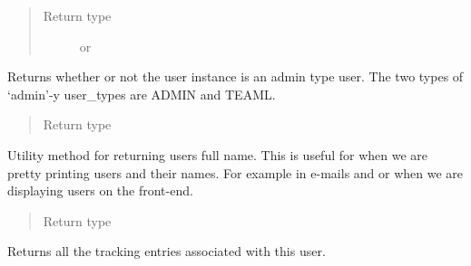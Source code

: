 \documentclass[letterpaper,10pt,english]{sphinxmanual}
\begin{document}
\begin{fulllineitems}
\begin{fulllineitems}
\begin{quote}
\begin{description}
\item[{Return type}] \leavevmode
{} or 

\end{description}\end{quote}

\end{fulllineitems}


\begin{fulllineitems}
\label{timetracker:timetracker.tracker.models.Tbluser.is_admin}
Returns whether or not the user instance is an admin type user. The
two types of `admin'-y user\_types are ADMIN and TEAML.
\begin{quote}\begin{description}
\item[{Return type}] \leavevmode
{}

\end{description}\end{quote}

\end{fulllineitems}


\begin{fulllineitems}
\label{timetracker:timetracker.tracker.models.Tbluser.name}
Utility method for returning users full name. This is useful for when
we are pretty printing users and their names. For example in e-mails
and or when we are displaying users on the front-end.
\begin{quote}\begin{description}
\item[{Return type}] \leavevmode
{}

\end{description}\end{quote}

\end{fulllineitems}


\begin{fulllineitems}
\label{timetracker:timetracker.tracker.models.Tbluser.tracking_entries}
Returns all the tracking entries associated with
this user.


\end{fulllineitems}
\end{fulllineitems}
\end{document}
